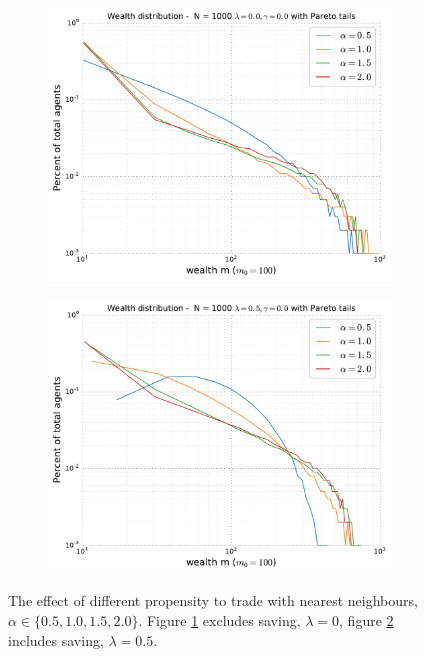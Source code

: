 \documentclass[10pt, a4paper]{amsart}
\begin{document}
\begin{figure}
\begin{subfigure}{.49\textwidth}
	\centering
	\includegraphics[width=\linewidth]{../figures/5d/5d_0-var-0.pdf}
	\caption{}
	\label{fig:neighbour1}
\end{subfigure}
\begin{subfigure}{.49\textwidth}
	\centering
	\includegraphics[width=\linewidth]{../figures/5d/5d_05-var-0.pdf}
	\caption{}
	\label{fig:neighbour2}
\end{subfigure}
\caption{The effect of different propensity to trade with nearest neighbours, $\alpha\in\{0.5,1.0,1.5,2.0\}$. Figure \ref{fig:neighbour1} excludes saving, $\lambda = 0$, figure \ref{fig:neighbour2} includes saving, $\lambda = 0.5$.}
\label{fig:neighbour}
\end{figure}
\end{document}
